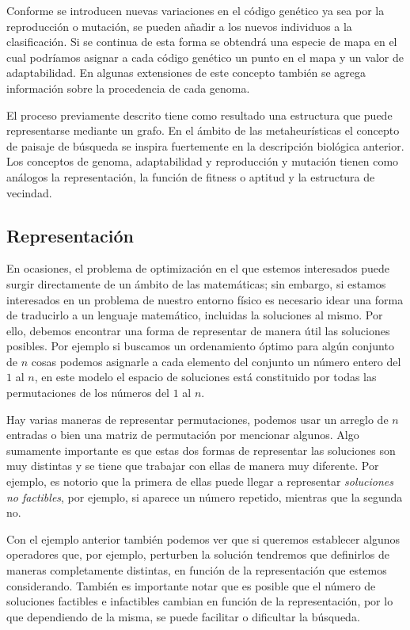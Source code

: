 Conforme se introducen nuevas variaciones en el código genético ya sea por la reproducción o mutación, se pueden añadir a los nuevos individuos a la clasificación. 
%
Si se continua de esta forma se obtendrá una especie de mapa en el cual podríamos asignar a cada código genético un punto en el mapa y un valor de adaptabilidad.
%
En algunas extensiones de este concepto también se agrega información sobre la procedencia de cada genoma.

El proceso previamente descrito tiene como resultado una estructura que puede representarse mediante un grafo. 
%
En el ámbito de las metaheurísticas el concepto de paisaje de búsqueda se inspira fuertemente en la descripción biológica anterior. 
%
Los conceptos de genoma, adaptabilidad y reproducción y mutación tienen como análogos la representación, la función de fitness o aptitud y la estructura de vecindad.   

\subsection{Representación}

En ocasiones, el problema de optimización en el que estemos interesados puede surgir directamente de un ámbito de las matemáticas;
%
sin embargo, si estamos interesados en un problema de nuestro entorno físico es necesario idear una forma de traducirlo a un lenguaje matemático, 
incluidas la soluciones al mismo. 
%
Por ello, debemos encontrar una forma de representar de manera útil las soluciones posibles.
%
Por ejemplo si buscamos un ordenamiento óptimo para algún conjunto de $n$ cosas podemos asignarle a cada elemento del conjunto un número entero del $1$ al $n$, 
en este modelo el espacio de soluciones está constituido por todas las permutaciones de los números del $1$ al $n$. 

Hay varias maneras de representar permutaciones, podemos usar un arreglo de $n$ entradas o bien una matriz de permutación por mencionar algunos. 
%
Algo sumamente importante es que estas dos formas de representar las soluciones son muy distintas y se tiene que trabajar con ellas de manera muy diferente. 
%
Por ejemplo, es notorio que la primera de ellas puede llegar a representar \textit{soluciones no factibles}, por ejemplo, si aparece un número repetido, mientras que 
la segunda no.

Con el ejemplo anterior también podemos ver que si queremos establecer algunos operadores que, por ejemplo, perturben la solución tendremos que definirlos de maneras 
completamente distintas, en función de la representación que estemos considerando.
%
También es importante notar que es posible que el número de soluciones factibles e infactibles cambian en función de la representación, por lo que dependiendo de
la misma, se puede facilitar o dificultar la búsqueda.

